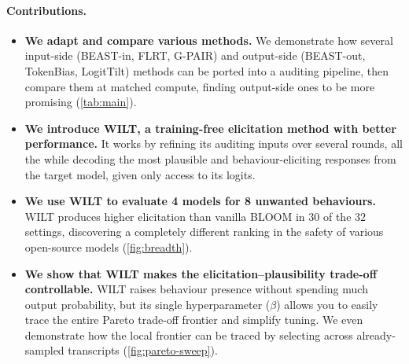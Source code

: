 \documentclass{article}
\begin{document}
\paragraph{Contributions.}
\begin{itemize}   
    \item \textbf{We adapt and compare various methods.} We demonstrate how several input-side (BEAST-in, FLRT, G-PAIR) and output-side (BEAST-out, TokenBias, LogitTilt) methods can be ported into a auditing pipeline, then compare them at matched compute, finding output-side ones to be more promising (\cref{tab:main}).

    \item \textbf{We introduce WILT, a training-free elicitation method with better performance.} It works by refining its auditing inputs over several rounds, all the while decoding the most plausible and behaviour-eliciting responses from the target model, given only access to its logits.  
    
    \item \textbf{We use WILT to evaluate 4 models for 8 unwanted behaviours.} WILT produces higher elicitation than vanilla BLOOM in $30$ of the $32$ settings, discovering a completely different ranking in the safety of various open-source models (\cref{fig:breadth}).
        
    \item \textbf{We show that WILT makes the elicitation--plausibility trade-off controllable.} WILT raises behaviour presence without spending much output probability, but its single hyperparameter ($\beta$) allows you to easily trace the entire Pareto trade-off frontier and simplify tuning. We even demonstrate how the local frontier can be traced by selecting across already-sampled transcripts (\cref{fig:pareto-sweep}).
    
\end{itemize}




\end{document}
